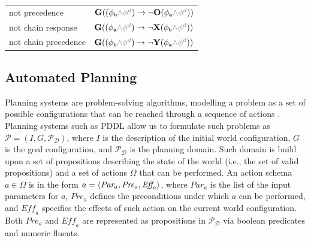 \begin{table}[t!]
{\begin{tabular}{ll}
not precedence & $\lglobally( (\phi_{\texttt{b}} \textcolor{gray}{\wedge \phi^d}) \rightarrow \neg \lonce (\phi_{\texttt{a}} \textcolor{gray}{\wedge \phi^d}))$ \\
not chain response  & $\lglobally( (\phi_{\texttt{a}} \textcolor{gray}{\wedge \phi^d}) \rightarrow \neg \lnext (\phi_{\texttt{b}} \textcolor{gray}{\wedge \phi^d}))$ \\
not chain precedence  & $\lglobally( (\phi_{\texttt{b}} \textcolor{gray}{\wedge \phi^d}) \rightarrow \neg \lyesterday (\phi_{\texttt{a}} \textcolor{gray}{\wedge \phi^d}))$ \\
\bottomrule
\end{tabular}}
\end{table}






\subsection{Automated Planning}\label{ssec:ap}
Planning systems are problem-solving algorithms, modelling a problem as a set of possible configurations that can be reached through a sequence of actions \cite{MaggiMCA18}. Planning systems such as PDDL allow us to formulate such problems as $\mathcal{P}=(I,G,\mathcal{P}_\mathcal
{D})$, where $I$ is the description of the initial world configuration, $G$ is the goal configuration, and $\mathcal{P}_\mathcal{D}$ is the planning domain. Such domain is build upon a set of propositions describing the state of the world (i.e., the set of valid propositions) and a set of actions $\Omega$ that can be performed. An action schema $a\in \Omega$ is in the form $a=\Braket{\textit{Par}_a,\textit{Pre}_a,\textit{Eff}_a}$, where $\textit{Par}_a$ is the list of the input parameters for $a$, $\textit{Pre}_a$ defines the preconditions under which $a$ can be performed, and $\textit{Eff}_a$ specifies the effects of such action on the current world configuration. Both  $\textit{Pre}_a$ and $\textit{Eff}_a$ are represented as propositions in $\mathcal{P}_\mathcal{D}$ via boolean predicates and numeric fluents.


